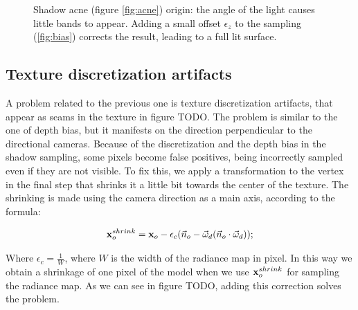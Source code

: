 \begin{figure}
\vspace{-3cm}
\centering
{}
\caption{Shadow acne (figure \ref{fig:acne}) origin: the angle of the light causes little bands to appear. Adding a small offset $\epsilon_z$ to the sampling (\ref{fig:bias}) corrects the result, leading to a full lit surface.}
\label{fig:shadowbias}
\end{figure}

\FloatBarrier
\subsection{Texture discretization artifacts}
A problem related to the previous one is texture discretization artifacts, that appear as seams in the texture in figure TODO. The problem is similar to the one of depth bias, but it manifests on the direction perpendicular to the directional cameras. Because of the discretization and the depth bias in the shadow sampling, some pixels become false positives, being incorrectly sampled even if they are not visible. To fix this, we apply a transformation to the vertex in the final step that shrinks it a little bit towards the center of the texture. The shrinking is made using the camera direction as a main axis, according to the formula:

$$
\mathbf{x}_o^{shrink} = \mathbf{x}_o - \epsilon_c (\vec{n}_o - \vec{\omega}_d (\vec{n}_o \cdot \vec{\omega}_d));
$$

Where $\epsilon_c = \frac{1}{W}$, where $W$ is the width of the radiance map in pixel. In this way we obtain a shrinkage of one pixel of the model when we use $\mathbf{x}_o^{shrink}$ for sampling the radiance map. As we can see in figure TODO, adding this correction solves the problem.

